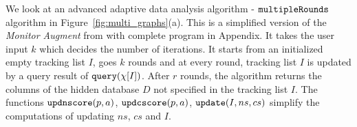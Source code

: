 \begin{example}
\label{ex:multipleRounds}
%
We look at an advanced adaptive data analysis algorithm - $\mathtt{multipleRounds}$ algorithm in Figure~\ref{fig:multi_graphs}(a).
This is a simplified version of the \emph{Monitor Augment} from \cite{RogersRSSTW20} with complete program in Appendix.
It takes the user input $k$ which decides the 
number of iterations.
It starts from an initialized empty tracking list $I$,
goes $k$ rounds and at every round, tracking list $I$ is updated by a query result of ${\tt query}(\chi[I])$.
After $r$ rounds, the algorithm returns the columns of the hidden database $D$ not specified in the tracking list $I$.
The functions $\mathtt{updnscore}(p,a)$,
$\mathtt{updcscore}(p,a)$, $\mathtt{update}(I,ns,cs)$ simplify the computations of updating $ns$, $cs$ and $I$.%


\end{example}
